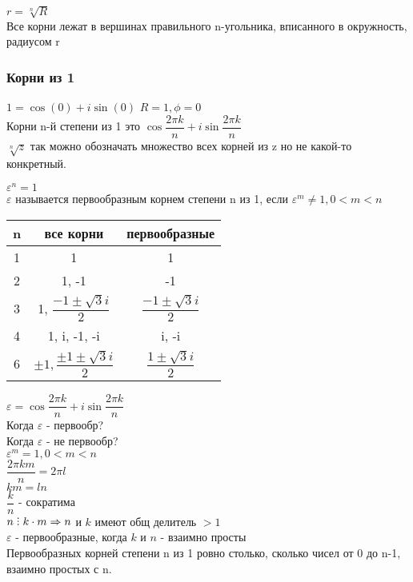$ r = \sqrt[n]{R} $ \\
Все корни лежат в вершинах правильного n-угольника, вписанного в окружность, радиусом r 
\subsubsection{Корни из 1}
$ 1 = \cos(0) + i \sin (0) $ 
$ R = 1, \phi = 0 $ \\
Корни n-й степени из 1 это $ \cos \dfrac{2 \pi k}{n} + i \sin \dfrac{2 \pi k}{n} $ \\
$ \sqrt[n]{z} $ так можно обозначать множество всех корней из z но не какой-то конкретный. \\
\begin{definition}
	$ \varepsilon^n = 1 $ \\
	$ \varepsilon $ называется первообразным корнем степени n из 1, если $ \varepsilon^m \neq 1, 0 < m < n $ \\
	
	\begin{tabular}{|c|c|c|}
		\hline
		n & все корни & первообразные \\
		\hline
		1 & 1 & 1 \\
		\hline
		2 & 1, -1 & -1 \\
		\hline
		3 & 1, $\dfrac{-1 \pm \sqrt{3} i }{2}$&  $\dfrac{-1 \pm \sqrt{3} i }{2}$\\
		\hline
		4 & 1, i, -1, -i & i, -i  \\
		\hline
		6 & $ \pm 1, \dfrac{\pm1 \pm \sqrt{3} i }{2}$&  $\dfrac{1 \pm \sqrt{3} i }{2}$\\
		\hline
	\end{tabular} 
\end{definition}

$ \varepsilon = \cos \dfrac{2 \pi k}{ n} + i \sin \dfrac{2 \pi k}{n} $ \\
Когда $ \varepsilon $ - первообр? \\
 Когда $ \varepsilon $ - не первообр? \\
$ \varepsilon^m = 1, 0 < m < n $ \\
$ \dfrac{2 \pi km}{n} = 2 \pi l $ \\
$ km = ln $ \\
$ \dfrac{k}{n}$ - сократима \\
$ n \divby k \cdot m \Rightarrow n$ и $k $ имеют общ делитель $ > 1 $\\
$ \varepsilon $ - первообразные, когда $k $ и $ n $ - взаимно просты \\
Первообразных корней степени n из 1 ровно столько, сколько чисел от 0 до n-1, взаимно простых с n. \\

